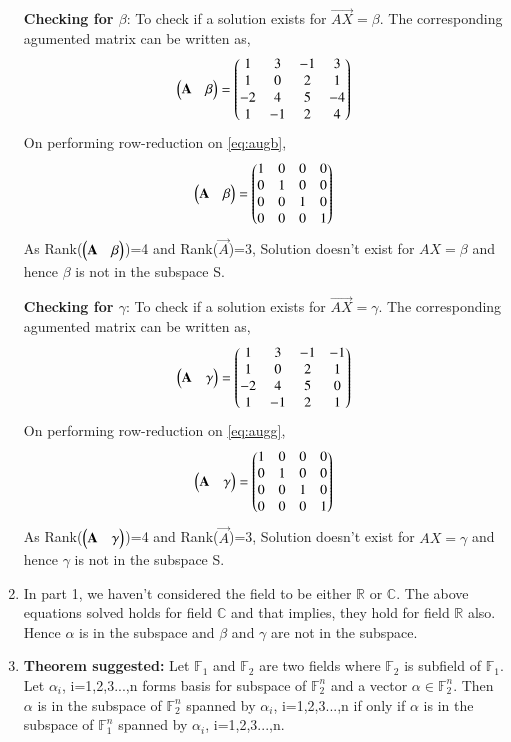 \documentclass[journal,12pt,twocolumn]{IEEEtran}
\begin{document}
\begin{enumerate}
\textbf{Checking for $\beta$}:
To check if a solution exists for $\vec{AX}=\beta$. The corresponding agumented matrix can be written as,
\begin{align} \label{eq:augb}
\begin{pmatrix}\mathbf{A}&\beta\end{pmatrix}=\begin{pmatrix}1&3&-1&3\\1&0&2&1\\-2&4&5&-4\\1&-1&2&4\end{pmatrix}
\end{align}
On performing row-reduction on \eqref{eq:augb}, 
\begin{align}\label{eq:refb}
\begin{pmatrix}\mathbf{A}&\beta\end{pmatrix}=\begin{pmatrix}1&0&0&0\\0&1&0&0\\0&0&1&0\\0&0&0&1\end{pmatrix}
\end{align}
As Rank($\begin{pmatrix}\mathbf{A}&\beta\end{pmatrix}$)=4 and Rank($\vec{A}$)=3, Solution doesn't exist for $AX=\beta$ and hence $\beta$ is not in the subspace S.

\textbf{Checking for $\gamma$}:
To check if a solution exists for $\vec{AX}=\gamma$. The corresponding agumented matrix can be written as,
\begin{align} \label{eq:augg}
\begin{pmatrix}\mathbf{A}&\gamma\end{pmatrix}=\begin{pmatrix}1&3&-1&-1\\1&0&2&1\\-2&4&5&0\\1&-1&2&1\end{pmatrix}
\end{align}
On performing row-reduction on \eqref{eq:augg}, 
\begin{align}\label{eq:refg}
\begin{pmatrix}\mathbf{A}&\gamma\end{pmatrix}=\begin{pmatrix}1&0&0&0\\0&1&0&0\\0&0&1&0\\0&0&0&1\end{pmatrix}
\end{align}
As Rank($\begin{pmatrix}\mathbf{A}&\gamma\end{pmatrix}$)=4 and Rank($\vec{A}$)=3, Solution doesn't exist for $AX=\gamma$ and hence $\gamma$ is not in the subspace S.
\item In part 1, we haven't considered the field to be either $\mathbb{R}$ or $\mathbb{C}$. The above equations solved holds for field $\mathbb{C}$ and that implies, they hold for field $\mathbb{R}$ also. Hence $\alpha$ is in the subspace and $\beta$ and $\gamma$ are not in the subspace.
\item \textbf{Theorem suggested:}
Let $\mathbb{F}_1$ and $\mathbb{F}_2$ are two fields where $\mathbb{F}_2$ is subfield of $\mathbb{F}_1$. Let $\alpha_i$, i=1,2,3...,n forms basis for subspace of $\mathbb{F}_2^n$ and a vector $\alpha \in \mathbb{F}_2^n$. Then $\alpha$ is in the subspace of $\mathbb{F}_2^n$ spanned by $\alpha_i$, i=1,2,3...,n if only if $\alpha$ is in the subspace of $\mathbb{F}_1^n$ spanned by $\alpha_i$, i=1,2,3...,n.
\end{enumerate}
\end{document}
